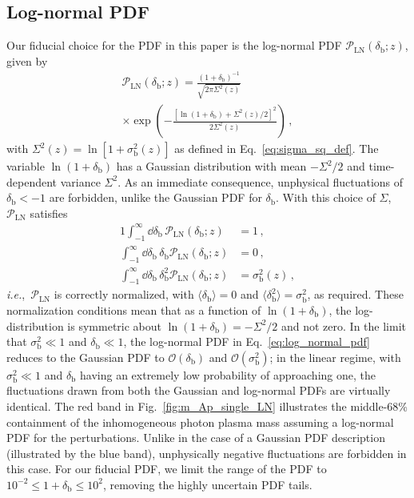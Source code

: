 \documentclass[prd,aps,10pt,nofootinbib,twocolumn,superscriptaddress,preprintnumbers,balancelastpage,longbibliography]{revtex4-1}
\begin{document}
\subsection{Log-normal PDF}
\label{sec:PDFs_LN_PDF}

Our fiducial choice for the PDF in this paper is the log-normal PDF $\mathcal{P}_\text{LN}(\delta_\text{b};z)$, given by
%
\begin{multline}
    \mathcal{P}_\text{LN}(\delta_\text{b};z) = \frac{(1+\delta_\text{b})^{-1}}{\sqrt{2\pi \Sigma^2(z)}} \\
    \times \exp \left(- \frac{[\ln(1 + \delta_\text{b}) + \Sigma^2(z)/2]^2}{2 \Sigma^2(z)}\right)\,,
    \label{eq:log_normal_pdf}
\end{multline}
%
with $\Sigma^2(z) = \ln[1 + \sigma_\text{b}^2(z)]$ as defined in Eq.~\eqref{eq:sigma_sq_def}. 
The variable $\ln(1+\delta_\text{b})$ has a Gaussian distribution with mean $-\Sigma^2/2$ and time-dependent variance $\Sigma^2$. 
As an immediate consequence, unphysical fluctuations of $\delta_\text{b} < -1$ are forbidden, unlike the Gaussian PDF for $\delta_\text{b}$. With this choice of $\Sigma$, $\mathcal{P}_\text{LN}$ satisfies
%
\begin{alignat}{1}
    \int_{-1}^\infty \dd \delta_\text{b} \, \mathcal{P}_\text{LN}(\delta_\text{b};z) &= 1 \,,  \\
    \int_{-1}^\infty \dd \delta_\text{b} \, \delta_\text{b} \mathcal{P}_\text{LN}(\delta_\text{b};z) &= 0 \,,  \\
    \int_{-1}^\infty \dd \delta_\text{b} \, \delta_\text{b}^2 \mathcal{P}_\text{LN}(\delta_\text{b};z) &= \sigma_\text{b}^2(z) \,,
\end{alignat}
%
\emph{i.e.},\ $\mathcal{P}_\text{LN}$ is correctly normalized, with $\langle \delta_\text{b} \rangle = 0$ and $\langle \delta_\text{b}^2 \rangle = \sigma_\text{b}^2$, as required. 
These normalization conditions mean that as a function of $\ln(1+\delta_\text{b})$, the log-distribution is symmetric about $\ln(1+\delta_\text{b}) = -\Sigma^2/2$ and not zero. 
In the limit that $\sigma_\text{b}^2 \ll 1$ and $\delta_\text{b} \ll 1$, the log-normal PDF in Eq.~\eqref{eq:log_normal_pdf} reduces to the Gaussian PDF to $\mathcal{O}(\delta_\text{b})$ and $\mathcal{O}(\sigma_\text{b}^2)$; in the linear regime, with $\sigma_\text{b}^2 \ll 1$ and $\delta_\text{b}$ having an extremely low probability of approaching one, the fluctuations drawn from both the Gaussian and log-normal PDFs are virtually identical. The red band in Fig.~\ref{fig:m_Ap_single_LN} illustrates the middle-68\% containment of the inhomogeneous photon plasma mass assuming a log-normal PDF for the perturbations. Unlike in the case of a Gaussian PDF description (illustrated by the blue band), unphysically negative fluctuations are forbidden in this case. For our fiducial PDF, we limit the range of the PDF to $10^{-2} \leq 1 + \delta_\text{b} \leq 10^2$, removing the highly uncertain PDF tails.
\end{document}
